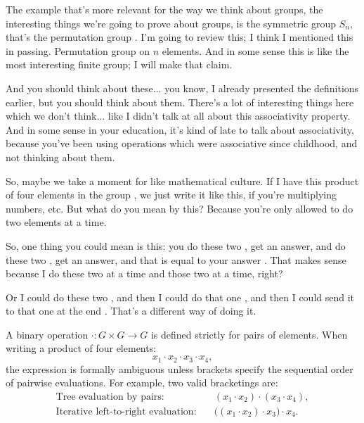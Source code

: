 \begin{speech}[00:51:49 - 00:53:39]
The example that's more relevant for the way we think about groups, the interesting things we're going to prove about groups, is the symmetric group $S_n$, that's the permutation group . I'm going to review this; I think I mentioned this in passing. Permutation group on $n$ elements. And in some sense this is like the most interesting finite group; I will make that claim.

And you should think about these... you know, I already presented the definitions earlier, but you should think about them. There's a lot of interesting things here which we don't think... like I didn't talk at all about this associativity property. And in some sense in your education, it's kind of late to talk about associativity, because you've been using operations which were associative since childhood, and not thinking about them.

So, maybe we take a moment for like mathematical culture. If I have this product of four elements in the group , we just write it like this, if you're multiplying numbers, etc. But what do you mean by this? Because you're only allowed to do two elements at a time.

So, one thing you could mean is this: you do these two , get an answer, and do these two , get an answer, and that is equal to your answer . That makes sense because I do these two at a time and those two at a time, right?

Or I could do these two , and then I could do that one , and then I could send it to that one at the end . That's a different way of doing it.
\end{speech}

\begin{content}
A binary operation $\cdot \colon G \times G \to G$ is defined strictly for pairs of elements. When writing a product of four elements:
\[
x_1 \cdot x_2 \cdot x_3 \cdot x_4,
\]
the expression is formally ambiguous unless brackets specify the sequential order of pairwise evaluations. For example, two valid bracketings are:
\begin{align}
\text{Tree evaluation by pairs:} &\quad (x_1 \cdot x_2) \cdot (x_3 \cdot x_4), \label{eq:bracket-pairs} \\
\text{Iterative left-to-right evaluation:} &\quad \bigl((x_1 \cdot x_2) \cdot x_3\bigr) \cdot x_4. \label{eq:bracket-left}
\end{align}
\end{content}

